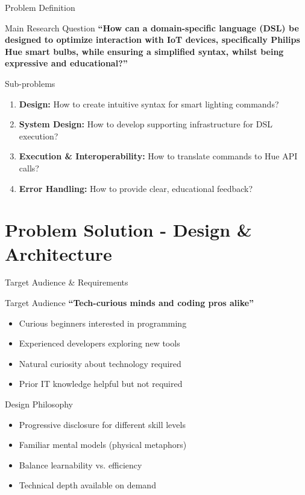 \documentclass{beamer}
\begin{document}
\begin{frame}{Problem Definition}
\begin{block}{Main Research Question}
\textbf{``How can a domain-specific language (DSL) be designed to optimize interaction with IoT devices, specifically Philips Hue smart bulbs, while ensuring a simplified syntax, whilst being expressive and educational?''}
\end{block}

\begin{block}{Sub-problems}
\begin{enumerate}
    \item \textbf{Design:} How to create intuitive syntax for smart lighting commands?
    \item \textbf{System Design:} How to develop supporting infrastructure for DSL execution?
    \item \textbf{Execution \& Interoperability:} How to translate commands to Hue API calls?
    \item \textbf{Error Handling:} How to provide clear, educational feedback?
\end{enumerate}
\end{block}
\end{frame}


\section{Problem Solution - Design \& Architecture}

\begin{frame}{Target Audience \& Requirements}
\begin{block}{Target Audience}
\textbf{``Tech-curious minds and coding pros alike''}
\begin{itemize}
    \item Curious beginners interested in programming
    \item Experienced developers exploring new tools
    \item Natural curiosity about technology required
    \item Prior IT knowledge helpful but not required
\end{itemize}
\end{block}

\begin{block}{Design Philosophy}
\begin{itemize}
    \item Progressive disclosure for different skill levels
    \item Familiar mental models (physical metaphors)
    \item Balance learnability vs. efficiency
    \item Technical depth available on demand
\end{itemize}
\end{block}
\end{frame}
\end{document}
